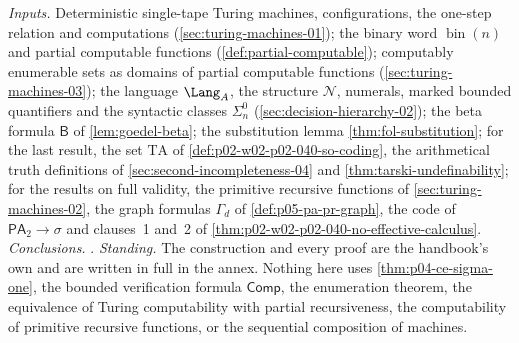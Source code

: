 \emph{Inputs.}  Deterministic single-tape Turing machines, configurations,
the one-step relation and computations (\cref{sec:turing-machines-01});
the binary word \(\operatorname{bin}(n)\) and partial computable functions
(\cref{def:partial-computable}); computably enumerable sets as domains of
partial computable functions (\cref{sec:turing-machines-03}); the language
\(\Lang_A\), the structure \(\mathcal N\), numerals, marked bounded
quantifiers and the syntactic classes \(\Sigma^0_n\)
(\cref{sec:decision-hierarchy-02}); the beta formula \(\mathsf B\) of
\cref{lem:goedel-beta}; the substitution lemma \cref{thm:fol-substitution};
for the last result, the set \(\mathrm{TA}\) of
\cref{def:p02-w02-p02-040-so-coding}, the arithmetical truth definitions of
\cref{sec:second-incompleteness-04} and \cref{thm:tarski-undefinability};
for the results on full validity, the primitive recursive functions of
\cref{sec:turing-machines-02}, the graph formulas \(\Gamma_d\) of
\cref{def:p05-pa-pr-graph}, the code of \(\mathsf{PA}_2\to\sigma\) and
clauses~1 and~2 of \cref{thm:p02-w02-p02-040-no-effective-calculus}.
\emph{Conclusions.}
.
\emph{Standing.}  The construction and every proof are the handbook's own
and are written in full in the annex.  Nothing here uses
\cref{thm:p04-ce-sigma-one}, the bounded verification formula
\(\mathsf{Comp}\), the enumeration theorem, the equivalence of Turing
computability with partial recursiveness, the computability of primitive
recursive functions, or the sequential composition of machines.


